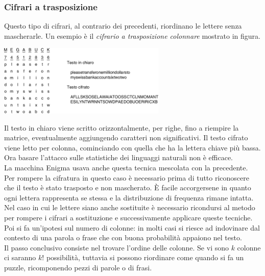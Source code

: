 \documentclass[10pt,a4paper,twoside]{article}
\begin{document}
\subsubsection{Cifrari a trasposizione}
Questo tipo di cifrari, al contrario dei precedenti, riordinano le lettere senza mascherarle. Un esempio è il \textit{cifrario a trasposizione colonnare} mostrato in figura.
\begin{center}
\includegraphics[width=0.6\textwidth]{images/cifrario_trasposizione.png}
\end{center}
Il testo in chiaro viene scritto orizzontalmente, per righe, fino a riempire la matrice, eventualmente aggiungendo caratteri non significativi. Il testo cifrato viene letto per colonna, cominciando con quella che ha la lettera chiave più bassa.\\
Ora basare l'attacco sulle statistiche dei linguaggi naturali non è efficace.\\
La macchina Enigma usava anche questa tecnica mescolata con la precedente.\\
Per rompere la cifratura in questo caso è necessario prima di tutto riconoscere che il testo è stato trasposto e non mascherato. È facile accorgersene in quanto ogni lettera rappresenta se stessa e la distribuzione di frequenza rimane intatta. Nel caso in cui le lettere siano anche sostituite è necessario ricondursi al metodo per rompere i cifrari a sostituzione e successivamente applicare queste tecniche.\\
Poi si fa un'ipotesi sul numero di colonne: in molti casi si riesce ad indovinare dal contesto di una parola o frase che con buona probabilità appaiono nel testo.\\
Il passo conclusivo consiste nel trovare l'ordine delle colonne. Se vi sono $k$ colonne ci saranno $k!$ possibilità, tuttavia si possono riordinare come quando si fa un puzzle, ricomponendo pezzi di parole o di frasi.
\end{document}

